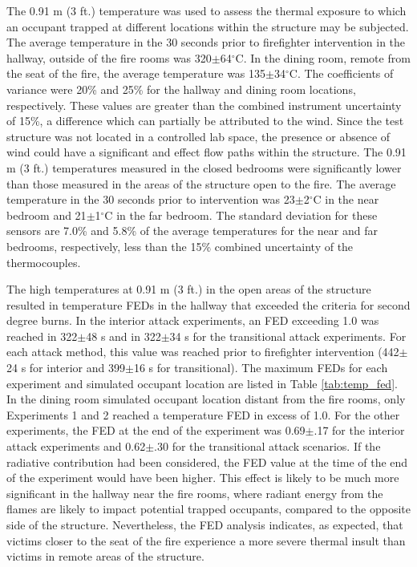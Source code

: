 \documentclass[12pt,oneside]{article}
\begin{document}
The 0.91 m (3 ft.) temperature was used to assess the thermal exposure to which an occupant trapped at different locations within the structure may be subjected. The average temperature in the 30 seconds prior to firefighter intervention in the hallway, outside of the fire rooms was 320$\pm$64$^{\circ}$C. In the dining room, remote from the seat of the fire, the average temperature was 135$\pm$34$^{\circ}$C. The coefficients of variance were 20\% and 25\% for the hallway and dining room locations, respectively. These values are greater than the combined instrument uncertainty of 15\%, a difference which can partially be attributed to the wind. Since the test structure was not located in a controlled lab space, the presence or absence of wind could have a significant and effect flow paths within the structure. The 0.91 m (3 ft.) temperatures measured in the closed bedrooms were significantly lower than those measured in the areas of the structure open to the fire. The average temperature in the 30 seconds prior to intervention was 23$\pm$2$^{\circ}$C in the near bedroom and 21$\pm$1$^{\circ}$C in the far bedroom. The standard deviation for these sensors are 7.0\% and 5.8\% of the average temperatures for the near and far bedrooms, respectively, less than the 15\% combined uncertainty of the thermocouples.

The high temperatures at 0.91 m (3 ft.) in the open areas of the structure resulted in temperature FEDs in the hallway that exceeded the criteria for second degree burns. In the interior attack experiments, an FED exceeding 1.0 was reached in 322$\pm$48 s and in 322$\pm$34 s for the transitional attack experiments. For each attack method, this value was reached prior to firefighter intervention (442$\pm$24 s for interior and 399$\pm$16 s for transitional). The maximum FEDs for each experiment and simulated occupant location are listed in Table \ref{tab:temp_fed}. In the dining room simulated occupant location distant from the fire rooms, only Experiments 1 and 2 reached a temperature FED in excess of 1.0. For the other experiments, the FED at  the end of the experiment was 0.69$\pm$.17 for the interior attack experiments and 0.62$\pm$.30 for the transitional attack scenarios.  If the radiative contribution had been considered, the FED value at the time of the end of the experiment would have been higher. This effect is likely to be much more significant in the hallway near the fire rooms, where radiant energy from the flames are likely to impact potential trapped occupants, compared to the opposite side of the structure. Nevertheless, the FED analysis indicates, as expected, that victims closer to the seat of the fire experience a more severe thermal insult than victims in remote areas of the structure.
\end{document}
